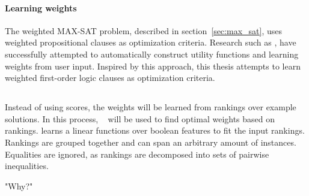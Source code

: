 \paragraph{Learning weights}
The weighted MAX-SAT problem, described in section~\ref{sec:max_sat}, uses weighted propositional clauses as optimization criteria.
Research such as \cite{campigotto2011active}, have successfully attempted to  automatically construct utility functions and learning weights from user input.
Inspired by this approach, this thesis attempts to learn weighted first-order logic clauses as optimization criteria.

\subsection{\svm}
Instead of using scores, the weights will be learned from rankings over example solutions.
In this process, \svm \  \cite{joachims2002optimizing} will be used to find optimal weights based on rankings.
\svm learns a linear functions over boolean features to fit the input rankings.
Rankings are grouped together and can span an arbitrary amount of instances.
Equalities are ignored, as rankings are decomposed into sets of pairwise inequalities.

"Why?"